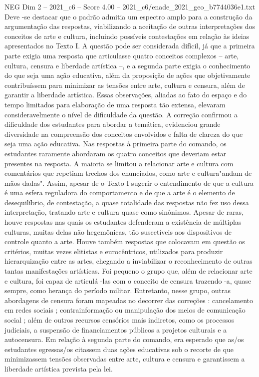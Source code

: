 \begin{textsample}{NEG Dim 2 – 2021\_c6 – Score 4.00 – 2021\_c6/enade\_2021\_geo\_b7744036e1.txt}
Deve -se destacar que o padrão admitia um espectro amplo para a construção da argumentação das respostas, viabilizando a aceitação de outras interpretações dos conceitos de arte e cultura, incluindo possíveis contestações em relação às ideias apresentados no Texto I.
A questão pode ser considerada difícil, já que a primeira parte exigia uma resposta que articulasse quatro conceitos complexos – arte, cultura, censura e liberdade artística –, e a segunda parte exigia o conhecimento do que seja uma ação educativa, além da proposição de ações que objetivamente contribuíssem para minimizar as tensões entre arte, cultura e censura, além de garantir a liberdade artística.
Essas observações, aliadas ao fato do espaço e do tempo limitados para elaboração de uma resposta tão extensa, elevaram consideravelmente o nível de dificuldade da questão.
A correção confirmou a dificuldade dos estudantes para abordar a temática, evidenciou grande diversidade na compreensão dos conceitos envolvidos e falta de clareza do que seja uma ação educativa.
Nas respostas à primeira parte do comando, os estudantes raramente abordaram os quatro conceitos que deveriam estar presentes na resposta.
A maioria se limitou a relacionar arte e cultura com comentários que repetiam trechos dos enunciados, como arte e cultura"andam de mãos dadas".
Assim, apesar de o Texto I sugerir o entendimento de que a cultura é uma esfera reguladora do comportamento e de que a arte é o elemento de desequilíbrio, de contestação, a quase totalidade das respostas não fez uso dessa interpretação, tratando arte e cultura quase como sinônimos.
Apesar de raras, houve respostas nas quais os estudantes defenderam a existência de múltiplas culturas, muitas delas não hegemônicas, tão suscetíveis aos dispositivos de controle quanto a arte.
Houve também respostas que colocavam em questão os critérios, muitas vezes elitistas e eurocêntricos, utilizados para produzir hierarquização entre as artes, chegando a inviabilizar o reconhecimento de outras tantas manifestações artísticas.
Foi pequeno o grupo que, além de relacionar arte e cultura, foi capaz de articulá -las com o conceito de censura trazendo -a, quase sempre, como herança do período militar.
Entretanto, nesse grupo, outras abordagens de censura foram mapeadas no decorrer das correções : cancelamento em redes sociais ; contrainformação ou manipulação dos meios de comunicação social ; além de outros recursos censórios mais indiretos, como os processos judiciais, a suspensão de financiamentos públicos a projetos culturais e a autocensura.
Em relação à segunda parte do comando, era esperado que as/os estudantes egressas/os citassem duas ações educativas sob o recorte de que minimizassem tensões observadas entre arte, cultura e censura e garantissem a liberdade artística prevista pela lei.

\end{textsample}
